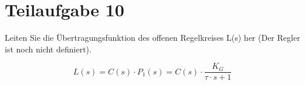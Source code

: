 \section{Teilaufgabe 10}
\begin{aufgabe}
Leiten Sie die Übertragungsfunktion des offenen Regelkreises L(s) her (Der 
Regler ist noch nicht definiert).
\end{aufgabe}
\[ L(s) = C(s) \cdot P_1(s) = C(s) \cdot \frac{K_G}{\tau \cdot s + 1} \]
